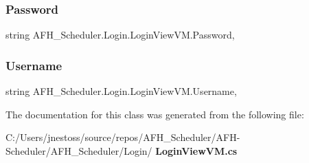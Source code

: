\subsubsection{Password}
{\footnotesize\ttfamily string A\+F\+H\+\_\+\+Scheduler.\+Login.\+Login\+View\+V\+M.\+Password\hspace{0.3cm}{\ttfamily [get]}, {\ttfamily [set]}}

\mbox{\label{class_a_f_h___scheduler_1_1_login_1_1_login_view_v_m_ab70a9835b6267f67a94be6c52928698c}} 
\subsubsection{Username}
{\footnotesize\ttfamily string A\+F\+H\+\_\+\+Scheduler.\+Login.\+Login\+View\+V\+M.\+Username\hspace{0.3cm}{\ttfamily [get]}, {\ttfamily [set]}}



The documentation for this class was generated from the following file\+:\begin{DoxyCompactItemize}
\item 
C\+:/\+Users/jnestoss/source/repos/\+A\+F\+H\+\_\+\+Scheduler/\+A\+F\+H-\/\+Scheduler/\+A\+F\+H\+\_\+\+Scheduler/\+Login/\textbf{ Login\+View\+V\+M.\+cs}\end{DoxyCompactItemize}
